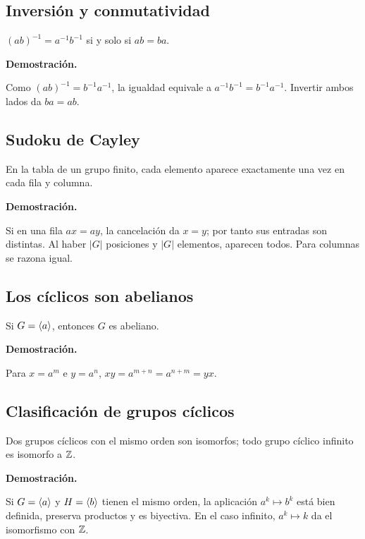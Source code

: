 \documentclass[11pt,a4paper]{article}
\begin{document}
\subsection{Inversión y conmutatividad}
\begin{resultado}
$(ab)^{-1}=a^{-1}b^{-1}$ si y solo si $ab=ba$.
\end{resultado}
\textbf{Demostración.}
\begin{demostracion}
Como $(ab)^{-1}=b^{-1}a^{-1}$, la igualdad equivale a $a^{-1}b^{-1}=b^{-1}a^{-1}$. Invertir ambos lados da $ba=ab$.
\end{demostracion}


\subsection{Sudoku de Cayley}
\begin{resultado}
En la tabla de un grupo finito, cada elemento aparece exactamente una vez en cada fila y columna.
\end{resultado}
\textbf{Demostración.}
\begin{demostracion}
Si en una fila $ax=ay$, la cancelación da $x=y$; por tanto sus entradas son distintas. Al haber $|G|$ posiciones y $|G|$ elementos, aparecen todos. Para columnas se razona igual.
\end{demostracion}


\subsection{Los cíclicos son abelianos}
\begin{resultado}
Si $G=\langle a\rangle$, entonces $G$ es abeliano.
\end{resultado}
\textbf{Demostración.}
\begin{demostracion}
Para $x=a^m$ e $y=a^n$, $xy=a^{m+n}=a^{n+m}=yx$.
\end{demostracion}


\subsection{Clasificación de grupos cíclicos}
\begin{resultado}
Dos grupos cíclicos con el mismo orden son isomorfos; todo grupo cíclico infinito es isomorfo a $\mathbb{Z}$.
\end{resultado}
\textbf{Demostración.}
\begin{demostracion}
Si $G=\langle a\rangle$ y $H=\langle b\rangle$ tienen el mismo orden, la aplicación $a^k\mapsto b^k$ está bien definida, preserva productos y es biyectiva. En el caso infinito, $a^k\mapsto k$ da el isomorfismo con $\mathbb{Z}$.
\end{demostracion}
\end{document}
